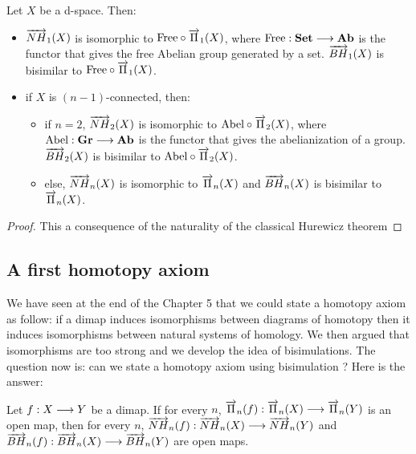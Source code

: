 \begin{theo} Let $X$ be a d-space. Then:
\begin{itemize}
	\item $\overrightarrow{NH}_{1}(X)$ is isomorphic to $\text{Free}\circ\overrightarrow{\Pi}_{1}(X)$, where $\text{Free} : \textbf{Set} \longrightarrow \textbf{Ab}$ is the functor that gives the free Abelian group generated by a set. $\overrightarrow{BH}_{1}(X)$ is bisimilar to $\text{Free}\circ\overrightarrow{\Pi}_{1}(X)$.
	\item if $X$ is $(n-1)$-connected, then:
		\begin{itemize}
			\item if $n =2$, $\overrightarrow{NH}_{2}(X)$ is isomorphic to $\text{Abel}\circ\overrightarrow{\Pi}_{2}(X)$, where $\text{Abel} : \textbf{Gr} \longrightarrow \textbf{Ab}$ is the functor that gives the abelianization of a group. $\overrightarrow{BH}_{2}(X)$ is bisimilar to $\text{Abel}\circ\overrightarrow{\Pi}_{2}(X)$.
			\item else, $\overrightarrow{NH}_{n}(X)$ is isomorphic to $\overrightarrow{\Pi}_{n}(X)$ and $\overrightarrow{BH}_{n}(X)$ is bisimilar to $\overrightarrow{\Pi}_{n}(X)$.
		\end{itemize}
\end{itemize}
\end{theo}

\begin{proof} This a consequence of the naturality of the classical Hurewicz theorem \end{proof}


\subsection{A first homotopy axiom}
\label{subsec:firhomax}

We have seen at the end of the Chapter 5 that we could state a homotopy axiom as follow: if a dimap induces isomorphisms between diagrams of homotopy then it induces isomorphisms between natural systems of homology. We then argued that isomorphisms are too strong and we develop the idea of bisimulations. The question now is: can we state a homotopy axiom using bisimulation ? Here is the answer:

\begin{theo}
Let $f : X \longrightarrow Y$ be a dimap. If for every $n$, $\overrightarrow{\Pi}_{n}(f) : \overrightarrow{\Pi}_{n}(X) \longrightarrow \overrightarrow{\Pi}_{n}(Y)$ is an open map, then for every $n$, $\overrightarrow{NH}_{n}(f) : \overrightarrow{NH}_{n}(X) \longrightarrow \overrightarrow{NH}_{n}(Y)$ and $\overrightarrow{BH}_{n}(f) : \overrightarrow{BH}_{n}(X) \longrightarrow \overrightarrow{BH}_{n}(Y)$ are open maps.
\end{theo}

